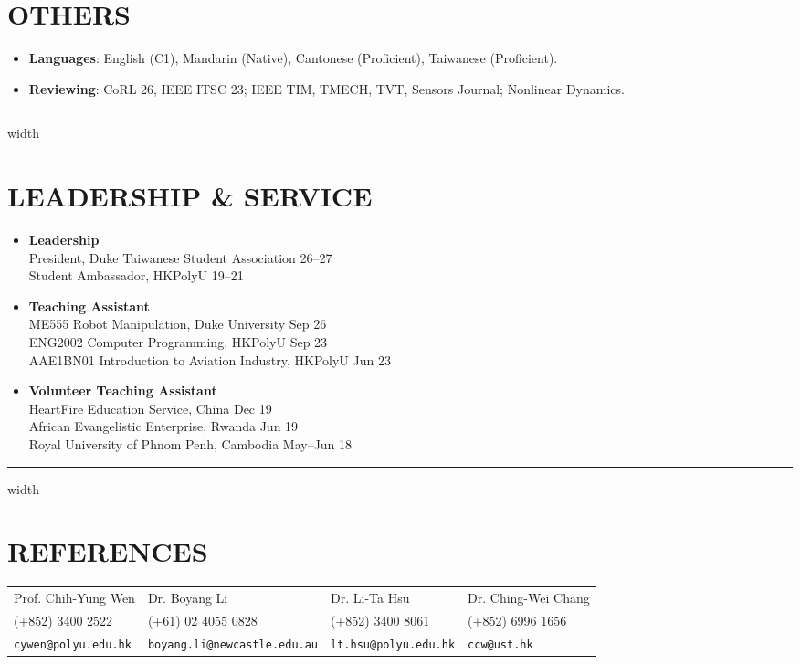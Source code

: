 \documentclass[overlapped]{res}
\begin{document}
\begin{resume}
\section{OTHERS}
\begin{itemize}
  \item \textbf{Languages}: English (C1), Mandarin (Native), Cantonese (Proficient), Taiwanese (Proficient).
  \item \textbf{Reviewing}: CoRL \textquotesingle{}26, IEEE ITSC \textquotesingle{}23; IEEE TIM, TMECH, TVT, Sensors Journal; Nonlinear Dynamics.
\end{itemize}
\par\noindent\hrule width \linewidth
\section{LEADERSHIP \& SERVICE}
\begin{itemize}
  \item \textbf{Leadership}\\
  President, Duke Taiwanese Student Association \hfill \textquotesingle{}26--\textquotesingle{}27\\
  Student Ambassador, HKPolyU \hfill \textquotesingle{}19--\textquotesingle{}21
  \item \textbf{Teaching Assistant}\\
  ME555 Robot Manipulation, Duke University \hfill Sep \textquotesingle{}26\\
  ENG2002 Computer Programming, HKPolyU \hfill Sep \textquotesingle{}23\\
  AAE1BN01 Introduction to Aviation Industry, HKPolyU \hfill Jun \textquotesingle{}23
  \item \textbf{Volunteer Teaching Assistant}\\
  HeartFire Education Service, China \hfill Dec \textquotesingle{}19\\
  African Evangelistic Enterprise, Rwanda \hfill Jun \textquotesingle{}19\\
  Royal University of Phnom Penh, Cambodia \hfill May--Jun \textquotesingle{}18
\end{itemize}
\par\noindent\hrule width \linewidth %
\section{REFERENCES}
\vspace{5pt} %
\begin{tabularx}{\textwidth}{l l l l}
  Prof. Chih-Yung Wen & Dr. Boyang Li & Dr. Li-Ta Hsu & Dr. Ching-Wei Chang \\
  (+852) 3400 2522 & (+61) 02 4055 0828 & (+852) 3400 8061 & (+852) 6996 1656 \\
  \texttt{cywen@polyu.edu.hk} & \texttt{boyang.li@newcastle.edu.au} & \texttt{lt.hsu@polyu.edu.hk} & \texttt{ccw@ust.hk}
\end{tabularx}







\end{resume}
\end{document}
